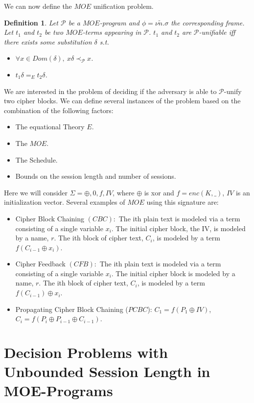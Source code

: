 \documentclass{easychair}
\newtheorem{definition}{Definition}
\begin{document}
We can now define the $MOE$ unification problem.

\begin{definition}
	Let $\mathcal{P}$ be a $MOE$-program and $\phi = \nu \tilde{n}.\sigma$ the corresponding frame. Let $t_1$ and $t_2$
	be two $MOE$-terms appearing in $\mathcal{P}$. $t_1$ and $t_2$
	are $\mathcal{P}$-unifiable iff there exists some substitution
	$\delta$ s.t.
	\begin{itemize}
		\item $\forall x \in Dom(\delta), ~x\delta \prec_{\mathcal{P}} x$.
		\item $t_1 \delta =_E t_2\delta$.
	\end{itemize}
\end{definition}

We are interested in the problem of deciding if the adversary is able to $\mathcal{P}$-unify two cipher blocks. We can define several instances of the problem based on the combination of the following factors:
\begin{itemize}
	\item The equational Theory $E$.
	\item The $MOE$.
	\item The Schedule.
	\item Bounds on the session length and number of sessions.  
\end{itemize}

Here we will consider $\Sigma ={\oplus, 0, f, IV}$, where $\oplus$ is xor and $f=enc(K,\_)$, $IV$ is an initialization vector.
Several examples of $MOE$ using this signature are: 
\begin{itemize}
	\item Cipher Block Chaining $(CBC):$ The ith plain text is modeled via a term consisting of a single variable $x_i$. The initial cipher block, the IV, is modeled by a name, $r$. The ith block of cipher text, $C_i$, is modeled by a
	term $f(C_{i-1} \oplus x_i)$.
	\item Cipher Feedback $(CFB):$ The ith plain text is modeled via a term consisting of a single variable $x_i$. The initial cipher block is modeled by a name, $r$. The ith block of cipher text, $C_i$, is modeled by a
	term $f(C_{i-1}) \oplus x_i$.  
	\item Propagating Cipher Block Chaining ($PCBC$): 
	$C_1 = f(P_1 \oplus IV)$, $C_i = f(P_i \oplus P_{i-1} \oplus C_{i-1})$.
\end{itemize}



\section{Decision Problems with Unbounded Session Length in MOE-Programs}
\end{document}
